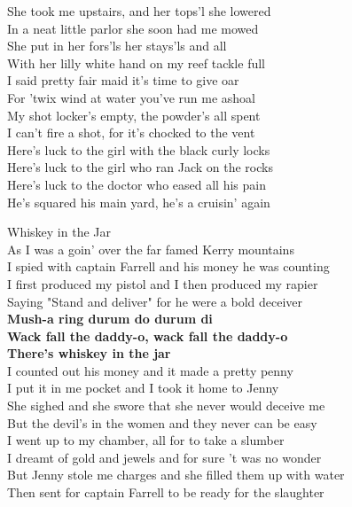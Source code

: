 \documentclass[letterpaper,9pt]{article}
\begin{document}
She took me upstairs, and her tops'l she lowered \\
In a neat little parlor she soon had me mowed \\
She put in her fors'ls her stays'ls and all \\
With her lilly white hand on my reef tackle full \\

I said pretty fair maid it's time to give oar \\
For 'twix wind at water you've run me ashoal \\
My shot locker's empty, the powder's all spent \\
I can't fire a shot, for it's chocked to the vent \\

Here's luck to the girl with the black curly locks \\
Here's luck to the girl who ran Jack on the rocks \\
Here's luck to the doctor who eased all his pain \\
He's squared his main yard, he's a cruisin' again \\

\newpage
{}
\Huge
Whiskey in the Jar\\

\Large
As I was a goin' over the far famed Kerry mountains \\
I spied with captain Farrell and his money he was counting \\
I first produced my pistol and I then produced my rapier \\
Saying "Stand and deliver" for he were a bold deceiver \\
\textbf{Mush-a ring durum do durum di \\
Wack fall the daddy-o, wack fall the daddy-o \\
There's whiskey in the jar} \\

I counted out his money and it made a pretty penny \\
I put it in me pocket and I took it home to Jenny \\
She sighed and she swore that she never would deceive me \\
But the devil's in the women and they never can be easy \\

I went up to my chamber, all for to take a slumber \\
I dreamt of gold and jewels and for sure 't was no wonder \\
But Jenny stole me charges and she filled them up with water \\
Then sent for captain Farrell to be ready for the slaughter \\
\end{document}
